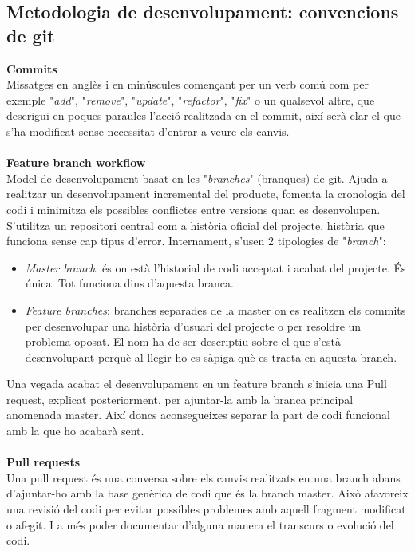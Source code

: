 \subsection{Metodologia de desenvolupament: convencions de git}
\textbf{Commits}
\\
Missatges en anglès i en minúscules començant per un verb comú com per exemple "\textit{add}", "\textit{remove}", "\textit{update}", "\textit{refactor}", "\textit{fix}" o un qualsevol altre, que descrigui en poques paraules l'acció realitzada en el commit, així serà clar el que s'ha modificat sense necessitat d'entrar a veure els canvis.
\\\\
\textbf{Feature branch workflow}
\\
Model de desenvolupament basat en les "\textit{branches}" (branques) de git. Ajuda a realitzar un desenvolupament incremental del producte, fomenta la cronologia del codi i minimitza els possibles conflictes entre versions quan es desenvolupen. S'utilitza un repositori central com a història oficial del projecte, història que funciona sense cap tipus d'error. Internament, s'usen 2 tipologies de "\textit{branch}":
\begin{itemize}
\item \textit{Master branch}: és on està l'historial de codi acceptat i acabat del projecte. És única. Tot funciona dins d'aquesta branca.
\item \textit{Feature branches}: branches separades de la master on es realitzen els commits per desenvolupar una història d'usuari del projecte o per resoldre un problema oposat. El nom ha de ser descriptiu sobre el que s'està desenvolupant perquè al llegir-ho es sàpiga què es tracta en aquesta branch.
\end{itemize}
Una vegada acabat el desenvolupament en un feature branch s'inicia una Pull request, explicat posteriorment, per ajuntar-la amb la branca principal anomenada master. Així doncs aconsegueixes separar la part de codi funcional amb la que ho acabarà sent.
\\\\
\textbf{Pull requests}
\\
Una pull request és una conversa sobre els canvis realitzats en una branch abans d'ajuntar-ho amb la base genèrica de codi que és la branch master. Això afavoreix una revisió del codi per evitar possibles problemes amb aquell fragment modificat o afegit. I a més poder documentar d'alguna manera el transcurs o evolució del codi.

